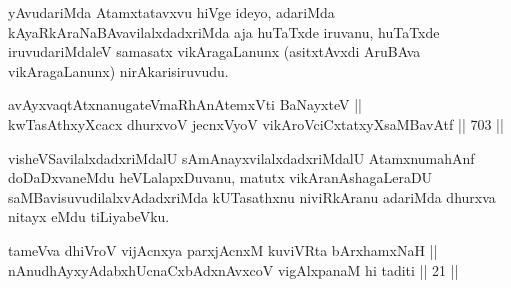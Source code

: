 \begin{artha} 
yAvudariMda Atamxtatavxvu hiVge ideyo, adariMda kAyaR\-kAraNaBAvavilalxdadxriMda aja huTaTxde iruvanu, huTaTxde iruvudariMdaleV samasatx vikAragaLanunx (asitxtAvxdi AruBAva vikAragaLanunx) nirAkarisiruvudu.
\end{artha}

\begin{shl}
avAyxvaqtAtxnanugateVmaRhAnAtemxVti BaNayxteV || \\
kwTasAthxyXcacx dhurxvoV jecnxVyoV vikAroVciCxtatxyXsaMBavAtf \hfill || 703 ||  
\end{shl}

\begin{artha} 
visheVSavilalxdadxriMdalU sAmAnayxvilalxdadxriMdalU Atamxnu\break mahAnf doDaDxvaneMdu heVLalapxDuvanu, matutx vikAranAshagaLeraDU saMBavisuvudilalxvAdadxriMda kUTasathxnu niviRkAranu adariMda dhurxva nitayx eMdu tiLiyabeVku.
\end{artha}


\begin{shl}
tameVva dhiVroV vijAcnxya parxjAcnxM kuviVRta bArxhamxNaH ||\\
nAnudhAyxyAdabxhUcnaCxbAdxnAvxcoV vigAlxpanaM hi taditi || 21 ||
\end{shl}


